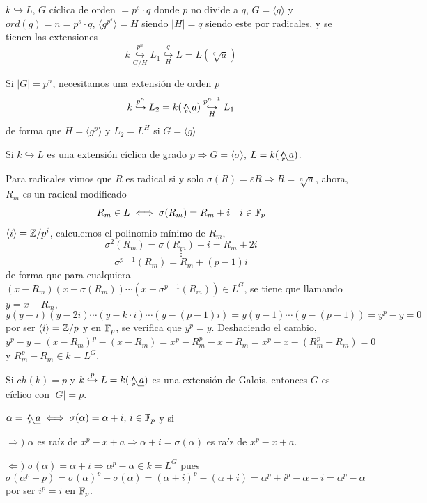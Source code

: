 \begin{prop}
    $k \hookrightarrow L$, $G$ c\'iclica de orden $=p^s\cdot q$ donde $p$ no divide a $q$, $G = \langle g \rangle$ y $ord(g) = n=p^s\cdot q$, $\langle g^{p^s} \rangle = H$ siendo $|H|=q$ siendo este por radicales, y se tienen las extensiones
    $$k \overset{p^n}{\underset{G/H}{\hookrightarrow}} L_1 \overset{q}{\underset{H}{\hookrightarrow}} L = L(\sqrt[q]{a}) $$

    Si $|G|=p^n$, necesitamos una extensi\'on de orden $p$
    $$k \overset{p^n}{\underset{}{\hookrightarrow}} L_2 = k (\usqrt[p]{a}) \overset{p^{n-1}}{\underset{H}{\hookrightarrow}} L_1 $$
    de forma que $H = \langle g^p\rangle$ y $L_2= L^H$ si $G=\langle g \rangle$
\end{prop}
\begin{prop}
    Si $k \hookrightarrow L$ es una extensi\'on c\'iclica de grado $p \Rightarrow G = \langle \sigma \rangle$, $L = k(\usqrt[p]{a})$.
\end{prop}
\begin{obs}
    Para radicales vimos que $R$ es radical si y solo $\sigma(R) = \varepsilon R \Rightarrow R = \sqrt[n]{a}$, ahora, $R_m$ es un radical modificado
    $$R_m \in L \iff \sigma(R_m) = R_m + i \quad i \in \mathbb{F}_p$$
    $\langle i \rangle =\mathbb{Z} / p^i$, calculemos el polinomio m\'inimo de $R_m$,
    $$\sigma^2(R_m) = \sigma(R_m) + i = R_m +2i $$
    $$\vdots $$
    $$\sigma^{p-1}(R_m) = R_m + (p-1)i $$
    de forma que para cualquiera $(x-R_m)(x-\sigma(R_m))\cdots (x - \sigma^{p-1}(R_m)) \in L^G$, se tiene que llamando $y=x-R_m$, 
    $$y(y-i)(y-2i)\cdots (y-k\cdot i)\cdots (y-(p-1)i) = y(y-1) \cdots (y-(p-1)) = y^p - y = 0 $$
    por ser $\langle i \rangle =\mathbb{Z} / p $ y en $\mathbb{F}_p$, se verifica que $y^p=y$. Deshaciendo el cambio, $y^p-y = (x-R_m)^p - (x-R_m) = x^p- R_m^p - x - R_m = x^p - x - (R_m^p+R_m) = 0$ y $R_m^p - R_m \in k = L^G$. 
\end{obs}
\begin{lem}
    Si $ch(k) = p$ y $k \overset{p}{\hookrightarrow} L = k(\usqrt[p]{a})$ es una extensi\'on de Galois, entonces $G$ es c\'iclico con $|G|=p$. 
\end{lem}
\begin{dem}
    $\alpha=\usqrt[p]{a} \iff \sigma (\alpha) = \alpha+i, \, i \in \bb F_p$ y si 
    
    $\Rightarrow)$ $\alpha$ es ra\'iz de $x^p-x+a \Rightarrow \alpha+i = \sigma(\alpha)$ es ra\'iz de $x^p-x+a$.  

    $\Leftarrow)$ $\sigma(\alpha) = \alpha+i \Rightarrow \alpha^p - \alpha \in k = L^G$ pues
    $$\sigma(\alpha^p - p ) = \sigma(\alpha)^p - \sigma(\alpha) = (\alpha+i)^p - (\alpha+i) = \alpha^p + i^p - \alpha - i = \alpha^p - \alpha$$
    por ser $i^p = i $ en $\mathbb{F}_p$. 
\end{dem}
